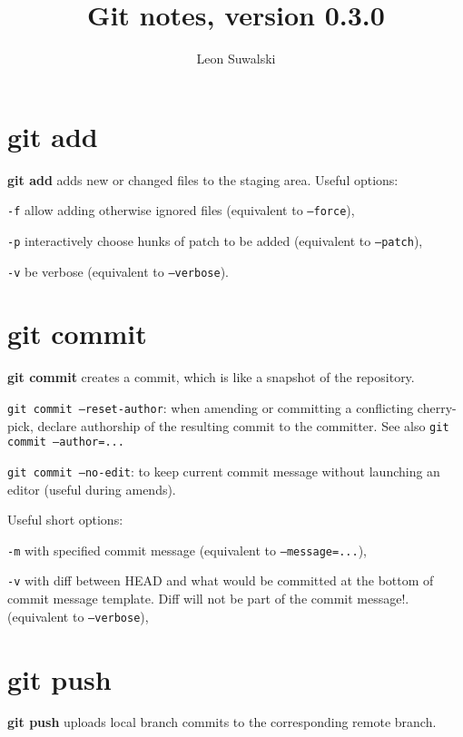 \documentclass{charun}
\title{Git notes, version 0.3.0}
\author{Leon Suwalski}
\begin{document}
\begin{multicols*}{2}
\maketitle
\raggedright

\section{git add}
\textbf{git add} adds new or changed files to the staging area.
Useful options:
\begin{compactenum}
\item [\texttt{-f}] allow adding otherwise ignored files (equivalent to \texttt{--force}),
\item [\texttt{-p}] interactively choose hunks of patch to be added (equivalent to \texttt{--patch}),
\item [\texttt{-v}] be verbose (equivalent to \texttt{--verbose}).
\end{compactenum}

\section{git commit}
\textbf{git commit} creates a commit, which is like a snapshot of the repository.

\texttt{git commit --reset-author}: when amending or committing a conflicting cherry-pick, declare authorship of the resulting commit to the committer.
See also \texttt{git commit --author=...}

\texttt{git commit --no-edit}: to keep current commit message without launching an editor (useful during amends).

Useful short options:
\begin{compactenum}
\item [\texttt{-m}] with specified commit message (equivalent to \texttt{--message=...}),
\item [\texttt{-v}] with diff between HEAD and what would be committed at the bottom of commit message template.
Diff will not be part of the commit message!.
(equivalent to \texttt{--verbose}),
\end{compactenum}

\section{git push}
\textbf{git push} uploads local branch commits to the corresponding remote branch.


\end{multicols*}
\end{document}
